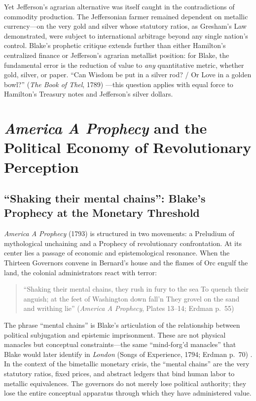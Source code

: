 \documentclass[
]{article}
\begin{document}
Yet Jefferson's agrarian alternative was itself caught in the
contradictions of commodity production. The Jeffersonian farmer remained
dependent on metallic currency---on the very gold and silver whose
statutory ratios, as Gresham's Law demonstrated, were subject to
international arbitrage beyond any single nation's control. Blake's
prophetic critique extends further than either Hamilton's centralized
finance or Jefferson's agrarian metallist position: for Blake, the
fundamental error is the reduction of value to \emph{any} quantitative
metric, whether gold, silver, or paper. ``Can Wisdom be put in a silver
rod? / Or Love in a golden bowl?'' (\emph{The Book of Thel}, 1789)
\citep{blake1789thel}---this question applies with equal force to
Hamilton's Treasury notes and Jefferson's silver dollars.

\newpage

\section{\texorpdfstring{\emph{America A Prophecy} and the Political
Economy of Revolutionary
Perception}{America A Prophecy and the Political Economy of Revolutionary Perception}}\label{america-a-prophecy-and-the-political-economy-of-revolutionary-perception}

\subsection{``Shaking their mental chains'': Blake's Prophecy at the
Monetary
Threshold}\label{shaking-their-mental-chains-blakes-prophecy-at-the-monetary-threshold}

\emph{America A Prophecy} (1793) is structured in two movements: a
Preludium of mythological unchaining and a Prophecy of revolutionary
confrontation. At its center lies a passage of economic and
epistemological resonance. When the Thirteen Governors convene in
Bernard's house and the flames of Orc engulf the land, the colonial
administrators react with terror:

\begin{quote}
``Shaking their mental chains, they rush in fury to the sea To quench
their anguish; at the feet of Washington down fall'n They grovel on the
sand and writhing lie'' (\emph{America A Prophecy}, Plates 13--14;
Erdman p.~55) \citep{erdman1988complete, blake1793america}
\end{quote}

The phrase ``mental chains'' is Blake's articulation of the relationship
between political subjugation and epistemic imprisonment. These are not
physical manacles but conceptual constraints---the same ``mind-forg'd
manacles'' that Blake would later identify in \emph{London} (Songs of
Experience, 1794; Erdman p.~70) \citep{erdman1988complete}. In the
context of the bimetallic monetary crisis, the ``mental chains'' are the
very statutory ratios, fixed prices, and abstract ledgers that bind
human labor to metallic equivalences. The governors do not merely lose
political authority; they lose the entire conceptual apparatus through
which they have administered value.
\end{document}

